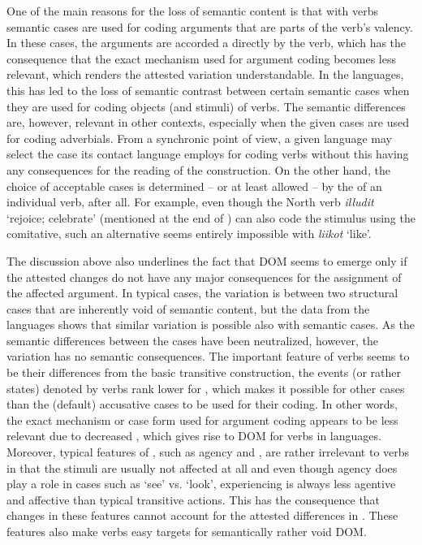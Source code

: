 \documentclass[output=paper]{LSP/langsci}
\begin{document}
 One of the main reasons for the loss of semantic content is that with  verbs semantic cases are used for coding arguments that are parts of the verb’s valency. In these cases, the arguments are accorded a  directly by the verb, which has the consequence that the exact mechanism used for argument coding becomes less relevant, which renders the attested variation understandable. In the  languages, this has led to the loss of semantic contrast between certain semantic cases when they are used for coding objects (and stimuli) of  verbs. The semantic differences are, however, relevant in other contexts, especially when the given cases are used for coding adverbials. From a synchronic point of view, a given language may select the case its contact language employs for coding  verbs without this having any consequences for the reading of the construction. On the other hand, the choice of acceptable cases is determined – or at least allowed – by the  of an individual verb, after all. For example, even though the North  verb \textit{illudit} ‘rejoice; celebrate’ (mentioned at the end of ) can also code the stimulus using the comitative, such an alternative seems entirely impossible with \textit{liikot} ‘like’.

The discussion above also underlines the fact that DOM seems to emerge only if the attested changes do not have any major consequences for the  assignment of the affected argument. In typical cases, the variation is between two structural cases that are inherently void of semantic content, but the data from the  languages shows that similar variation is possible also with semantic cases. As the semantic differences between the cases have been neutralized, however, the variation has no semantic consequences. The important feature of  verbs seems to be their differences from the basic transitive construction, \ie the events (or rather states) denoted by  verbs rank lower for , which makes it possible for other cases than the (default) accusative cases to be used for their coding. In other words, the exact mechanism or case form used for argument coding appears to be less relevant due to decreased , which gives rise to DOM for  verbs in  languages. Moreover, typical features of , such as agency and , are rather irrelevant to  verbs in that the stimuli are usually not affected at all and even though agency does play a role in cases such as ‘see’ vs. ‘look’, experiencing is always less agentive and affective than typical transitive actions. This has the consequence that changes in these features cannot account for the attested differences in . These features also make  verbs easy targets for semantically rather void DOM.
\end{document}
